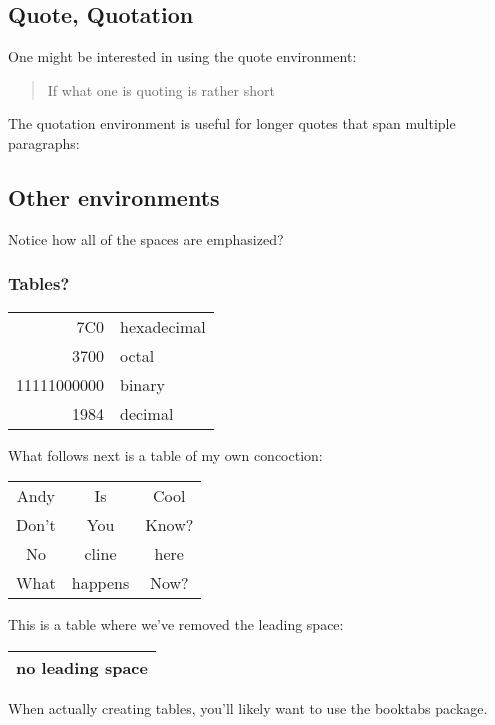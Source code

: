\documentclass[11pt]{article}
\begin{document}
\subsection{Quote, Quotation}

One might be interested in using the quote environment:
\begin{quote}
If what one is quoting is rather short
\end{quote}

The quotation environment is useful for longer quotes that span multiple paragraphs:
\begin{quotation}
\lipsum[1-4]
\end{quotation}

\subsection{Other environments}
\begin{verbatim*}
Notice how all of 
the spaces are emphasized?
\end{verbatim*}

\subsubsection{Tables?}
\begin{tabular}{|r|l|}
\hline
7C0 & hexadecimal \\
3700 & octal \\ \cline{2-2}
11111000000 & binary \\
\hline \hline
1984 & decimal \\
\hline
\end{tabular}

What follows next is a table of my own concoction:

\begin{tabular}{|c|c|c|}
\hline
Andy & Is & Cool \\ \cline{1-3}
Don't & You & Know? \\
No & cline & here \\
\hline
What & happens & Now? \\
\hline
\end{tabular}

This is a table where we've removed the leading space:

\begin{tabular}{@{} l @{}}
\hline
no leading space\\
\hline
\end{tabular}

When actually creating tables, you'll likely want to use the booktabs package.
\end{document}

